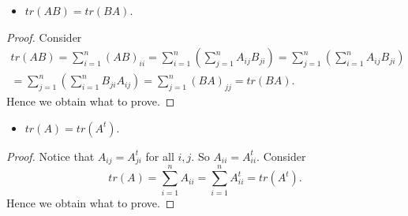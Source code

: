 \begin{Exercise}
\begin{itemize}
\item $tr(AB) = tr(BA)$.
\end{itemize}
\begin{proof}
Consider
\begin{gather*}
tr(AB)
= \sum_{i=1}^{n} (AB)_{i i}
= \sum_{i=1}^{n}\left( \sum_{j=1}^{n} A_{i j} B_{j i} \right)
= \sum_{j=1}^{n} \left( \sum_{i=1}^{n} A_{i j} B_{j i} \right) \\
= \sum_{j=1}^{n} \left( \sum_{i=1}^{n} B_{j i} A_{i j}  \right)
= \sum_{j=1}^{n} (BA)_{j j}
= tr(BA).
\end{gather*}
Hence we obtain what to prove.
\end{proof}

\begin{itemize}
\item $tr(A) = tr(A^t)$.
\end{itemize}
\begin{proof}
Notice that $A_{i j} = A^t_{j i}$ for all $i,j$. So $A_{i i} = A^t_{i i}$.
Consider
$$
tr(A)
= \sum_{i=1}^{n} A_{i i}
= \sum_{i=1}^{n} A^t_{i i}
= tr(A^t).
$$
Hence we obtain what to prove.
\end{proof}
\end{Exercise}